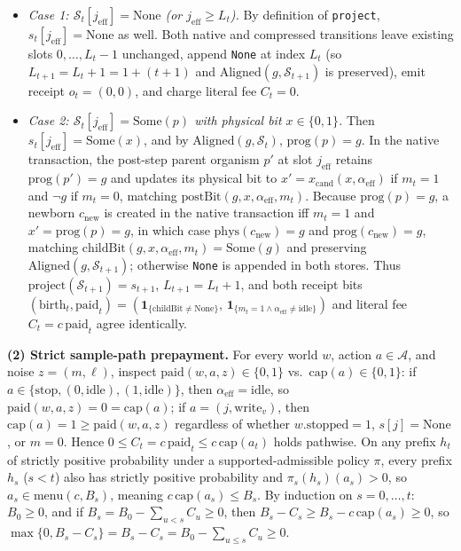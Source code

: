 \documentclass[11pt,a4paper]{article}
\providecommand{\tightlist}{\setlength{\itemsep}{2pt}\setlength{\parskip}{0pt}}
\begin{document}
\begin{itemize}
\tightlist
\item
  \emph{Case 1: \(\mathcal{S}_t[j_{\mathrm{eff}}] = \mathrm{None}\) (or
  \(j_{\mathrm{eff}} \ge L_t\)).} By definition of \texttt{project},
  \(s_t[j_{\mathrm{eff}}] = \mathrm{None}\) as well. Both native and
  compressed transitions leave existing slots \(0, \dots, L_t - 1\)
  unchanged, append \texttt{None} at index \(L_t\) (so
  \(L_{t+1} = L_t + 1 = 1 + (t+1)\) and
  \(\mathrm{Aligned}(g, \mathcal{S}_{t+1})\) is preserved), emit receipt
  \(o_t = (0,0)\), and charge literal fee \(C_t = 0\).
\item
  \emph{Case 2: \(\mathcal{S}_t[j_{\mathrm{eff}}] = \mathrm{Some}(p)\)
  with physical bit \(x \in \{0,1\}\).} Then
  \(s_t[j_{\mathrm{eff}}] = \mathrm{Some}(x)\), and by
  \(\mathrm{Aligned}(g, \mathcal{S}_t)\), \(\mathrm{prog}(p) = g\). In
  the native transaction, the post-step parent organism \(p'\) at slot
  \(j_{\mathrm{eff}}\) retains \(\mathrm{prog}(p') = g\) and updates its
  physical bit to \(x' = x_{\mathrm{cand}}(x, \alpha_{\mathrm{eff}})\)
  if \(m_t = 1\) and \(\neg g\) if \(m_t = 0\), matching
  \(\mathrm{postBit}(g, x, \alpha_{\mathrm{eff}}, m_t)\). Because
  \(\mathrm{prog}(p) = g\), a newborn \(c_{\mathrm{new}}\) is created in
  the native transaction iff \(m_t = 1\) and
  \(x' = \mathrm{prog}(p) = g\), in which case
  \(\mathrm{phys}(c_{\mathrm{new}}) = g\) and
  \(\mathrm{prog}(c_{\mathrm{new}}) = g\), matching
  \(\mathrm{childBit}(g, x, \alpha_{\mathrm{eff}}, m_t) = \mathrm{Some}(g)\)
  and preserving \(\mathrm{Aligned}(g, \mathcal{S}_{t+1})\); otherwise
  \texttt{None} is appended in both stores. Thus
  \(\mathrm{project}(\mathcal{S}_{t+1}) = s_{t+1}\),
  \(L_{t+1} = L_t + 1\), and both receipt bits
  \((\mathrm{birth}_t, \mathrm{paid}_t) = (\mathbf{1}_{\{\mathrm{childBit} \neq \mathrm{None}\}},\, \mathbf{1}_{\{m_t = 1 \land \alpha_{\mathrm{eff}} \neq \mathrm{idle}\}})\)
  and literal fee \(C_t = c\,\mathrm{paid}_t\) agree identically.
\end{itemize}

\textbf{(2) Strict sample-path prepayment.} For every world \(w\),
action \(a \in \mathcal{A}\), and noise \(z = (m, \ell)\), inspect
\(\mathrm{paid}(w, a, z) \in \{0,1\}\)
vs.~\(\mathrm{cap}(a) \in \{0,1\}\): if
\(a \in \{\mathrm{stop}, (0,\mathrm{idle}), (1,\mathrm{idle})\}\), then
\(\alpha_{\mathrm{eff}} = \mathrm{idle}\), so
\(\mathrm{paid}(w,a,z) = 0 = \mathrm{cap}(a)\); if
\(a = (j, \mathrm{write}_v)\), then
\(\mathrm{cap}(a) = 1 \ge \mathrm{paid}(w,a,z)\) regardless of whether
\(w.\mathrm{stopped} = 1\), \(s[j] = \mathrm{None}\), or \(m = 0\).
Hence \(0 \le C_t = c\,\mathrm{paid}_t \le c\,\mathrm{cap}(a_t)\) holds
pathwise. On any prefix \(h_t\) of strictly positive probability under a
supported-admissible policy \(\pi\), every prefix \(h_s\) (\(s < t\))
also has strictly positive probability and \(\pi_s(h_s)(a_s) > 0\), so
\(a_s \in \mathrm{menu}(c, B_s)\), meaning
\(c\,\mathrm{cap}(a_s) \le B_s\). By induction on \(s = 0, \dots, t\):
\(B_0 \ge 0\), and if \(B_s = B_0 - \sum_{u < s} C_u \ge 0\), then
\(B_s - C_s \ge B_s - c\,\mathrm{cap}(a_s) \ge 0\), so
\(\max\{0, B_s - C_s\} = B_s - C_s = B_0 - \sum_{u \le s} C_u \ge 0\).
\end{document}

